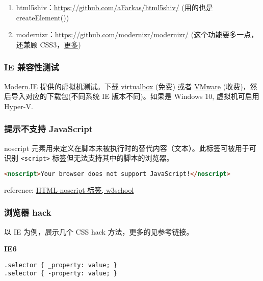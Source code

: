 \begin{enumerate}
\def\labelenumi{\arabic{enumi}.}
\tightlist
\item
  html5shiv：\url{https://github.com/aFarkas/html5shiv/} (用的也是
  createElement())
\item
  modernizr：\url{https://github.com/modernizr/modernizr/}
  (这个功能要多一点，还兼顾
  CSS3，\href{http://www.osmn00.com/translation/221.html}{更多})
\end{enumerate}

\subsubsection{IE 兼容性测试}\label{ie-ux517cux5bb9ux6027ux6d4bux8bd5}

\href{https://dev.modern.ie/}{Modern.IE}
提供的\href{https://dev.modern.ie/tools/vms/windows/}{虚拟机}测试。下载
\href{https://www.virtualbox.org/}{virtualbox} (免费) 或者
\href{http://www.vmware.com/}{VMware}
(收费)，然后导入对应的下载包(不同系统 IE 版本不同)。如果是 Windows 10,
虚拟机可启用 Hyper-V.

\subsubsection{提示不支持
JavaScript}\label{ux63d0ux793aux4e0dux652fux6301-javascript}

noscript
元素用来定义在脚本未被执行时的替代内容（文本）。此标签可被用于可识别
\lstinline!<script>! 标签但无法支持其中的脚本的浏览器。

\begin{lstlisting}[language=HTML]
<noscript>Your browser does not support JavaScript!</noscript>
\end{lstlisting}

reference: \href{http://www.w3school.com.cn/tags/tag_noscript.asp}{HTML
noscript 标签, w3school}

\subsubsection{浏览器 hack}\label{ux6d4fux89c8ux5668-hack}

以 IE 为例，展示几个 CSS hack 方法，更多的见参考链接。

\textbf{IE6}

\begin{lstlisting}
.selector { _property: value; }
.selector { -property: value; }
\end{lstlisting}


